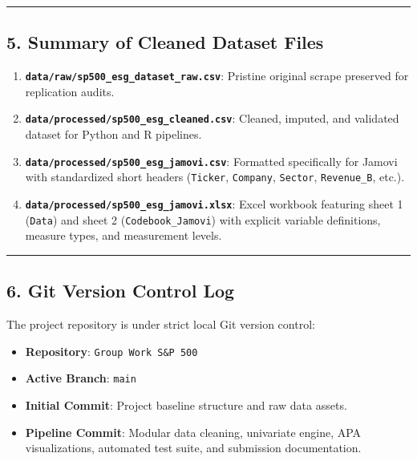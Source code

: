 \documentclass[
]{article}
\providecommand{\tightlist}{%
  \setlength{\itemsep}{0pt}\setlength{\parskip}{0pt}}
\begin{document}
\begin{center}\rule{0.5\linewidth}{0.5pt}\end{center}

\subsection{5. Summary of Cleaned Dataset
Files}\label{summary-of-cleaned-dataset-files}

\begin{enumerate}
\def\labelenumi{\arabic{enumi}.}
\tightlist
\item
  \textbf{\texttt{data/raw/sp500\_esg\_dataset\_raw.csv}}: Pristine
  original scrape preserved for replication audits.
\item
  \textbf{\texttt{data/processed/sp500\_esg\_cleaned.csv}}: Cleaned,
  imputed, and validated dataset for Python and R pipelines.
\item
  \textbf{\texttt{data/processed/sp500\_esg\_jamovi.csv}}: Formatted
  specifically for Jamovi with standardized short headers
  (\texttt{Ticker}, \texttt{Company}, \texttt{Sector},
  \texttt{Revenue\_B}, etc.).
\item
  \textbf{\texttt{data/processed/sp500\_esg\_jamovi.xlsx}}: Excel
  workbook featuring sheet 1 (\texttt{Data}) and sheet 2
  (\texttt{Codebook\_Jamovi}) with explicit variable definitions,
  measure types, and measurement levels.
\end{enumerate}

\begin{center}\rule{0.5\linewidth}{0.5pt}\end{center}

\subsection{6. Git Version Control Log}\label{git-version-control-log}

The project repository is under strict local Git version control:

\begin{itemize}
\tightlist
\item
  \textbf{Repository}: \texttt{Group\ Work\ S\&P\ 500}
\item
  \textbf{Active Branch}: \texttt{main}
\item
  \textbf{Initial Commit}: Project baseline structure and raw data
  assets.
\item
  \textbf{Pipeline Commit}: Modular data cleaning, univariate engine,
  APA visualizations, automated test suite, and submission
  documentation.
\end{itemize}
\end{document}
